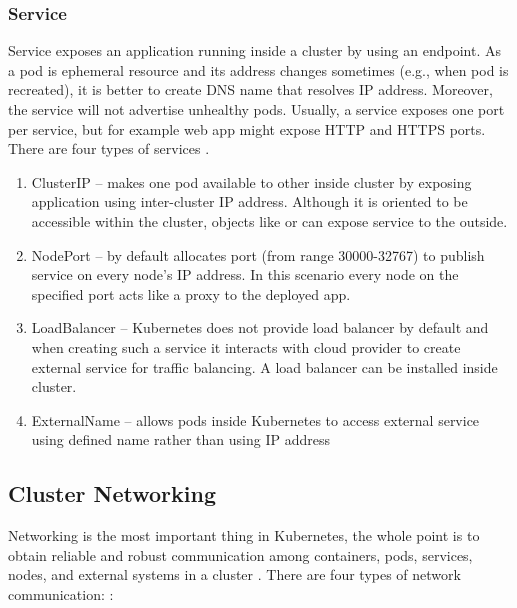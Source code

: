 \subsubsection{Service}
\label{svc}

Service exposes an application running inside a cluster by using an endpoint. As a pod is ephemeral resource and its address changes sometimes (e.g., when pod is recreated), it is better to create DNS name that resolves IP address. Moreover, the service will not advertise unhealthy pods. Usually, a service exposes one port per service, but for example web app might expose HTTP and HTTPS ports. There are four types of services \cite{KubernetesService}. 


\begin{enumerate}
    \item ClusterIP -- makes one pod available to other inside cluster by exposing application using inter-cluster IP address. Although it is oriented to be accessible within the cluster, objects like \textit{} or \textit{} can expose service to the outside.
    \item NodePort -- by default allocates port (from range 30000-32767) to publish service on every node's IP address. In this scenario every node on the specified port acts like a proxy to the deployed app.
    \item LoadBalancer -- Kubernetes does not provide load balancer by default and when creating such a service it interacts with cloud provider to create external service for traffic balancing. A load balancer can be installed inside cluster.
    \item ExternalName -- allows pods inside Kubernetes to access external service using defined name rather than using IP address 
\end{enumerate}




\subsection{Cluster Networking}
\label{sec:k8s_networking}

Networking is the most important thing in Kubernetes, the whole point is to obtain reliable and robust communication among containers, pods, services, nodes, and external systems in a cluster \cite{KubernetesClusterNetworking}. There are four types of network communication: \cite{KubernetesClusterNetworking}:

